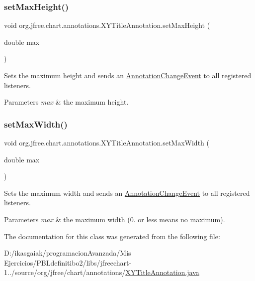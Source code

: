 \subsubsection{\texorpdfstring{set\+Max\+Height()}{setMaxHeight()}}
{\footnotesize\ttfamily void org.\+jfree.\+chart.\+annotations.\+X\+Y\+Title\+Annotation.\+set\+Max\+Height (\begin{DoxyParamCaption}\item[{double}]{max }\end{DoxyParamCaption})}

Sets the maximum height and sends an \mbox{\hyperlink{}{Annotation\+Change\+Event}} to all registered listeners.


\begin{DoxyParams}{Parameters}
{\em max} & the maximum height. \\
\hline
\end{DoxyParams}
\mbox{\label{classorg_1_1jfree_1_1chart_1_1annotations_1_1_x_y_title_annotation_ac7d8116f989fd907cbacea9df2210d7a}} 
\subsubsection{\texorpdfstring{set\+Max\+Width()}{setMaxWidth()}}
{\footnotesize\ttfamily void org.\+jfree.\+chart.\+annotations.\+X\+Y\+Title\+Annotation.\+set\+Max\+Width (\begin{DoxyParamCaption}\item[{double}]{max }\end{DoxyParamCaption})}

Sets the maximum width and sends an \mbox{\hyperlink{}{Annotation\+Change\+Event}} to all registered listeners.


\begin{DoxyParams}{Parameters}
{\em max} & the maximum width (0. or less means no maximum). \\
\hline
\end{DoxyParams}


The documentation for this class was generated from the following file\+:\begin{DoxyCompactItemize}
\item 
D\+:/ikasgaiak/programacion\+Avanzada/\+Mis Ejercicios/\+P\+B\+Ldefinitibo2/libs/jfreechart-\/1../source/org/jfree/chart/annotations/\mbox{\hyperlink{_x_y_title_annotation_8java}{X\+Y\+Title\+Annotation.\+java}}\end{DoxyCompactItemize}
